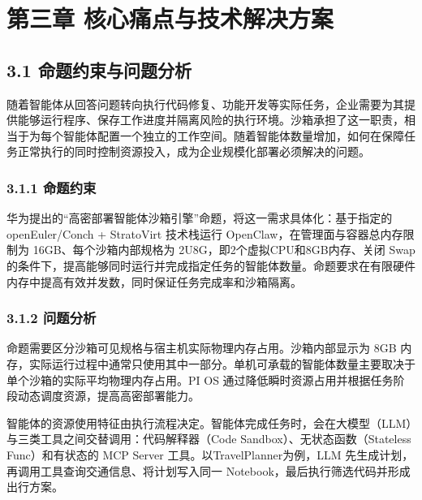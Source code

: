 \section{第三章 核心痛点与技术解决方案}\label{ux7b2cux4e09ux7ae0-ux6838ux5fc3ux75dbux70b9ux4e0eux6280ux672fux89e3ux51b3ux65b9ux6848}

\subsection{3.1 命题约束与问题分析}\label{ux547dux9898ux7ea6ux675fux4e0eux95eeux9898ux5206ux6790}

随着智能体从回答问题转向执行代码修复、功能开发等实际任务，企业需要为其提供能够运行程序、保存工作进度并隔离风险的执行环境。沙箱承担了这一职责，相当于为每个智能体配置一个独立的工作空间。随着智能体数量增加，如何在保障任务正常执行的同时控制资源投入，成为企业规模化部署必须解决的问题。

\subsubsection{3.1.1 命题约束}\label{ux547dux9898ux7ea6ux675f}

华为提出的``高密部署智能体沙箱引擎''命题，将这一需求具体化：基于指定的 openEuler/Conch + StratoVirt 技术栈运行 OpenClaw，在管理面与容器总内存限制为 16GB、每个沙箱内部规格为 2U8G，即2个虚拟CPU和8GB内存、关闭 Swap 的条件下，提高能够同时运行并完成指定任务的智能体数量。命题要求在有限硬件内存中提高有效并发数，同时保证任务完成率和沙箱隔离。

\subsubsection{3.1.2 问题分析}\label{ux95eeux9898ux5206ux6790}

命题需要区分沙箱可见规格与宿主机实际物理内存占用。沙箱内部显示为 8GB 内存，实际运行过程中通常只使用其中一部分。单机可承载的智能体数量主要取决于单个沙箱的实际平均物理内存占用。PI OS 通过降低瞬时资源占用并根据任务阶段动态调度资源，提高高密部署能力。


智能体的资源使用特征由执行流程决定。智能体完成任务时，会在大模型（LLM）与三类工具之间交替调用：代码解释器（Code Sandbox）、无状态函数（Stateless Func）和有状态的 MCP Server 工具。以TravelPlanner为例，LLM 先生成计划，再调用工具查询交通信息、将计划写入同一 Notebook，最后执行筛选代码并形成出行方案。

